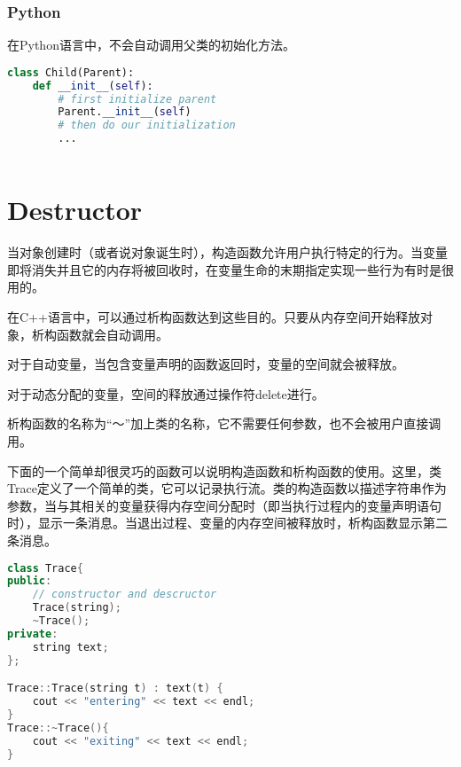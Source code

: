\subsection{Python}

在Python语言中，不会自动调用父类的初始化方法。


\begin{lstlisting}[language=Python]
class Child(Parent):
	def __init__(self):
		# first initialize parent
		Parent.__init__(self)
		# then do our initialization
		...
\end{lstlisting}


\begin{lstlisting}[language=C++]

\end{lstlisting}



\chapter{Destructor}



当对象创建时（或者说对象诞生时），构造函数允许用户执行特定的行为。当变量即将消失并且它的内存将被回收时，在变量生命的末期指定实现一些行为有时是很用的。

在C++语言中，可以通过析构函数达到这些目的。只要从内存空间开始释放对象，析构函数就会自动调用。

\begin{compactitem}
\item 对于自动变量，当包含变量声明的函数返回时，变量的空间就会被释放。
\item 对于动态分配的变量，空间的释放通过操作符delete进行。
\end{compactitem}

析构函数的名称为“～”加上类的名称，它不需要任何参数，也不会被用户直接调用。

下面的一个简单却很灵巧的函数可以说明构造函数和析构函数的使用。这里，类Trace定义了一个简单的类，它可以记录执行流。类的构造函数以描述字符串作为参数，当与其相关的变量获得内存空间分配时（即当执行过程内的变量声明语句时），显示一条消息。当退出过程、变量的内存空间被释放时，析构函数显示第二条消息。


\begin{lstlisting}[language=C++]
class Trace{
public:
	// constructor and descructor
	Trace(string);
	~Trace();
private:
	string text;
};

Trace::Trace(string t) : text(t) {
	cout << "entering" << text << endl;
}
Trace::~Trace(){
	cout << "exiting" << text << endl;
}
\end{lstlisting}


